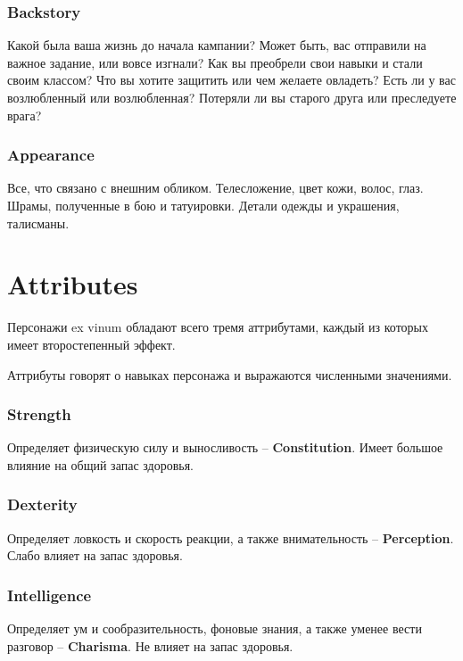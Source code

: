 \documentclass[a4paper,12pt,twocolumn]{book}
\begin{document}
\subsection{Backstory}

Какой была ваша жизнь до начала кампании? Может быть, вас отправили на важное задание, или вовсе изгнали? Как вы преобрели свои навыки и стали своим классом? Что вы хотите защитить или чем желаете овладеть? Есть ли у вас возлюбленный или возлюбленная? Потеряли ли вы старого друга или преследуете врага?

\subsection{Appearance}

Все, что связано с внешним обликом. Телесложение, цвет кожи, волос, глаз. Шрамы, полученные в бою и татуировки. Детали одежды и украшения, талисманы.

\chapter{Attributes}

\lettrine{П}{}ерсонажи ex vinum обладают всего тремя аттрибутами, каждый из которых имеет второстепенный эффект.

Аттрибуты говорят о навыках персонажа и выражаются численными значениями.

\subsection{Strength}

Определяет физическую силу и выносливость -- \textbf{Constitution}. Имеет большое влияние на общий запас здоровья.

\subsection{Dexterity}

Определяет ловкость и скорость реакции, а также внимательность -- \textbf{Perception}. Слабо влияет на запас здоровья.

\subsection{Intelligence}

Определяет ум и сообразительность, фоновые знания, а также уменее вести разговор -- \textbf{Charisma}. Не влияет на запас здоровья.
\end{document}
